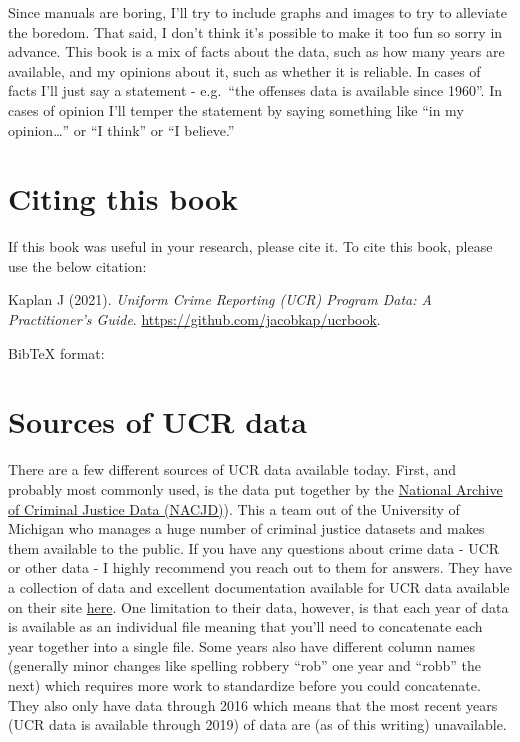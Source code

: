 \documentclass[
  12pt,
  openany]{book}
\begin{document}
Since manuals are boring, I'll try to include graphs and images to try to alleviate the boredom. That said, I don't think it's possible to make it too fun so sorry in advance. This book is a mix of facts about the data, such as how many years are available, and my opinions about it, such as whether it is reliable. In cases of facts I'll just say a statement - e.g.~``the offenses data is available since 1960''. In cases of opinion I'll temper the statement by saying something like ``in my opinion\ldots{}'' or ``I think'' or ``I believe.''

\hypertarget{citing-this-book}{%
\section{Citing this book}\label{citing-this-book}}

If this book was useful in your research, please cite it. To cite this book, please use the below citation:

Kaplan J (2021). \emph{Uniform Crime Reporting (UCR) Program Data: A Practitioner's Guide}. \url{https://github.com/jacobkap/ucrbook}.

BibTeX format:

\hypertarget{sources-of-ucr-data}{%
\section{Sources of UCR data}\label{sources-of-ucr-data}}

There are a few different sources of UCR data available today. First, and probably most commonly used, is the data put together by the \href{https://www.icpsr.umich.edu/web/pages/NACJD/index.html}{National Archive of Criminal Justice Data (NACJD)}). This a team out of the University of Michigan who manages a huge number of criminal justice datasets and makes them available to the public. If you have any questions about crime data - UCR or other data - I highly recommend you reach out to them for answers. They have a collection of data and excellent documentation available for UCR data available on their site \href{https://www.icpsr.umich.edu/web/NACJD/series/57}{here}. One limitation to their data, however, is that each year of data is available as an individual file meaning that you'll need to concatenate each year together into a single file. Some years also have different column names (generally minor changes like spelling robbery ``rob'' one year and ``robb'' the next) which requires more work to standardize before you could concatenate. They also only have data through 2016 which means that the most recent years (UCR data is available through 2019) of data are (as of this writing) unavailable.
\end{document}
